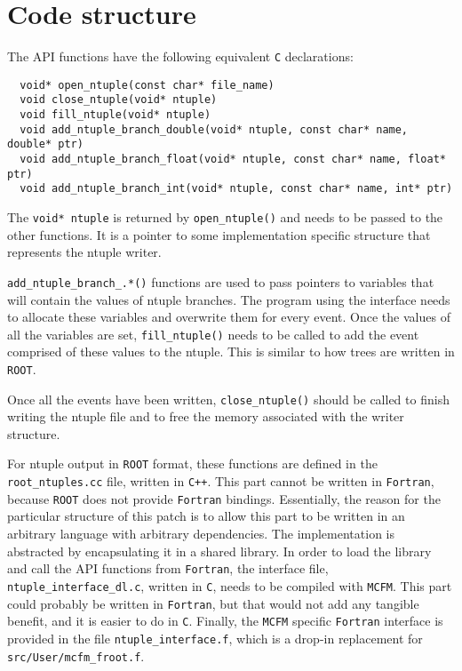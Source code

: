 \documentclass[12pt]{article}
\begin{document}
\clearpage
\section{Code structure}

The API functions have the following equivalent \texttt{C} declarations:
\begin{verbatim}
  void* open_ntuple(const char* file_name)
  void close_ntuple(void* ntuple)
  void fill_ntuple(void* ntuple)
  void add_ntuple_branch_double(void* ntuple, const char* name, double* ptr)
  void add_ntuple_branch_float(void* ntuple, const char* name, float* ptr)
  void add_ntuple_branch_int(void* ntuple, const char* name, int* ptr)
\end{verbatim}

The \texttt{void* ntuple} is returned by \texttt{open_ntuple()}
and needs to be passed to the other functions.
It is a pointer to some implementation specific structure that represents
the ntuple writer.

\texttt{add_ntuple_branch_.*()} functions are used to pass pointers to
variables that will contain the values of ntuple branches.
The program using the interface needs to allocate these variables and overwrite
them for every event.
Once the values of all the variables are set, \texttt{fill_ntuple()}
needs to be called to add the event comprised of these values to the ntuple.
This is similar to how trees are written in \texttt{ROOT}.

Once all the events have been written, \texttt{close_ntuple()} should be
called to finish writing the ntuple file and to free the memory associated with
the writer structure.

For ntuple output in \texttt{ROOT} format, these functions are defined in the
\texttt{root\_ntuples.cc} file, written in \texttt{C++}.
This part cannot be written in \texttt{Fortran}, because \texttt{ROOT} does not
provide \texttt{Fortran} bindings.
Essentially, the reason for the particular structure of this patch is to allow
this part to be written in an arbitrary language with arbitrary dependencies.
The implementation is abstracted by encapsulating it in a shared library.
In order to load the library and call the API functions from \texttt{Fortran},
the interface file, \texttt{ntuple\_interface\_dl.c}, written in \texttt{C},
needs to be compiled with \texttt{MCFM}.
This part could probably be written in \texttt{Fortran}, but that would not
add any tangible benefit, and it is easier to do in \texttt{C}.
Finally, the \texttt{MCFM} specific \texttt{Fortran} interface is provided in
the file \texttt{ntuple\_interface.f}, which is a drop-in replacement for
\texttt{src/User/mcfm\_froot.f}.
\end{document}
